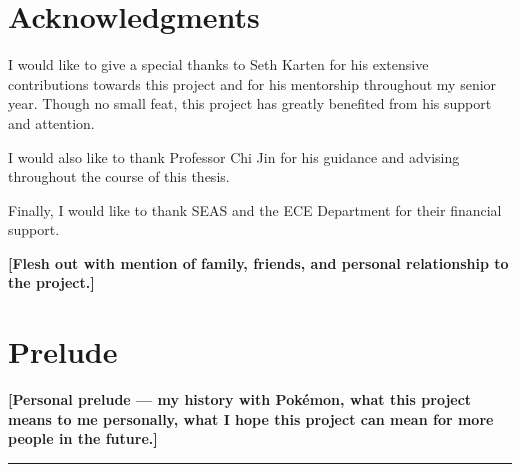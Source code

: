 \newpage


\section*{Acknowledgments}

I would like to give a special thanks to Seth Karten for his extensive contributions towards this project and for his mentorship throughout my senior year. Though no small feat, this project has greatly benefited from his support and attention.

I would also like to thank Professor Chi Jin for his guidance and advising throughout the course of this thesis.

Finally, I would like to thank SEAS and the ECE Department for their financial support.

\textbf{[Flesh out with mention of family, friends, and personal relationship to the project.]}

\newpage


\tableofcontents

\newpage


\section*{Prelude}

\textbf{[Personal prelude --- my history with Pok\'{e}mon, what this project means to me personally, what I hope this project can mean for more people in the future.]}

\vspace{2em}
\noindent\rule{\textwidth}{0.4pt}

\newpage
